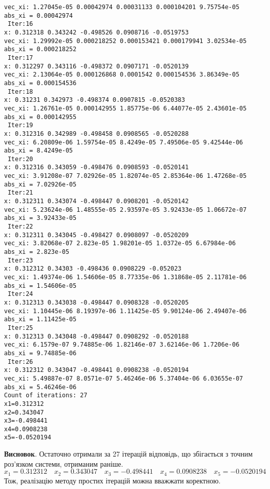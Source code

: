 \documentclass[14pt,a4paper]{scrartcl}
\theoremstyle{definition}
\theoremstyle{remark}
\theoremstyle{definition}
\theoremstyle{definition}
\begin{document}
\begin{verbatim}
vec_xi: 1.27045e-05 0.00042974 0.00031133 0.000104201 9.75754e-05
abs_xi = 0.00042974
 Iter:16
x: 0.312318 0.343242 -0.498526 0.0908716 -0.0519753
vec_xi: 1.29992e-05 0.000218252 0.000153421 0.000179941 3.02534e-05
abs_xi = 0.000218252
 Iter:17
x: 0.312297 0.343116 -0.498372 0.0907171 -0.0520139
vec_xi: 2.13064e-05 0.000126868 0.0001542 0.000154536 3.86349e-05
abs_xi = 0.000154536
 Iter:18
x: 0.31231 0.342973 -0.498374 0.0907815 -0.0520383
vec_xi: 1.26761e-05 0.000142955 1.85775e-06 6.44077e-05 2.43601e-05
abs_xi = 0.000142955
 Iter:19
x: 0.312316 0.342989 -0.498458 0.0908565 -0.0520288
vec_xi: 6.20809e-06 1.59754e-05 8.4249e-05 7.49506e-05 9.42544e-06
abs_xi = 8.4249e-05
 Iter:20
x: 0.312316 0.343059 -0.498476 0.0908593 -0.0520141
vec_xi: 3.91208e-07 7.02926e-05 1.82074e-05 2.85364e-06 1.47268e-05
abs_xi = 7.02926e-05
 Iter:21
x: 0.312311 0.343074 -0.498447 0.0908201 -0.0520142
vec_xi: 5.23624e-06 1.48555e-05 2.93597e-05 3.92433e-05 1.06672e-07
abs_xi = 3.92433e-05
 Iter:22
x: 0.312311 0.343045 -0.498427 0.0908097 -0.0520209
vec_xi: 3.82068e-07 2.823e-05 1.98201e-05 1.0372e-05 6.67984e-06
abs_xi = 2.823e-05
 Iter:23
x: 0.312312 0.34303 -0.498436 0.0908229 -0.052023
vec_xi: 1.49374e-06 1.54606e-05 8.77335e-06 1.31868e-05 2.11781e-06
abs_xi = 1.54606e-05
 Iter:24
x: 0.312313 0.343038 -0.498447 0.0908328 -0.0520205
vec_xi: 1.10445e-06 8.19397e-06 1.11425e-05 9.90124e-06 2.49407e-06
abs_xi = 1.11425e-05
 Iter:25
x: 0.312313 0.343048 -0.498447 0.0908292 -0.0520188
vec_xi: 6.1579e-07 9.74885e-06 1.82146e-07 3.62146e-06 1.7206e-06
abs_xi = 9.74885e-06
 Iter:26
x: 0.312312 0.343047 -0.498441 0.0908238 -0.0520194
vec_xi: 5.49887e-07 8.0571e-07 5.46246e-06 5.37404e-06 6.03655e-07
abs_xi = 5.46246e-06
Count of iterations: 27
x1=0.312312
x2=0.343047
x3=-0.498441
x4=0.0908238
x5=-0.0520194
\end{verbatim}
\textbf{Висновок}. Остаточно отримали за 27 ітерацій відповідь, що збігається з точним роз'язком системи, отриманим раніше.
$$
x_1=0.312312 \quad
x_2=0.343047 \quad
x_3=-0.498441 \quad
x_4=0.0908238 \quad
x_5=-0.0520194 \quad
$$
Тож, реалізацію методу простих ітерацій можна вважжати коректною.
\end{document}

